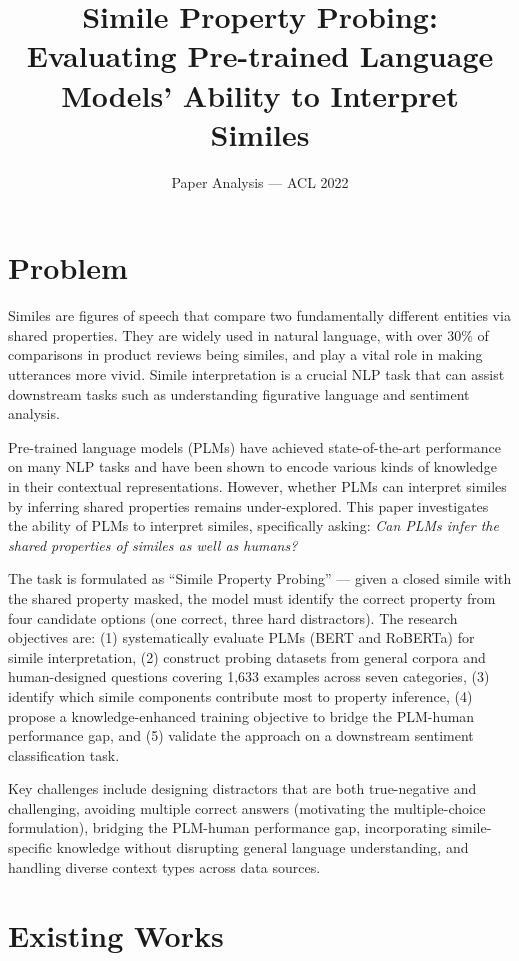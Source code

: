 \documentclass[12pt]{article}
\title{Simile Property Probing: Evaluating Pre-trained Language Models' Ability to Interpret Similes}
\author{Paper Analysis --- ACL 2022}
\date{}
\begin{document}
\maketitle

\section{Problem}

Similes are figures of speech that compare two fundamentally different entities via shared properties. They are widely used in natural language, with over 30\% of comparisons in product reviews being similes, and play a vital role in making utterances more vivid. Simile interpretation is a crucial NLP task that can assist downstream tasks such as understanding figurative language and sentiment analysis.

Pre-trained language models (PLMs) have achieved state-of-the-art performance on many NLP tasks and have been shown to encode various kinds of knowledge in their contextual representations. However, whether PLMs can interpret similes by inferring shared properties remains under-explored. This paper investigates the ability of PLMs to interpret similes, specifically asking: \textit{Can PLMs infer the shared properties of similes as well as humans?}

The task is formulated as ``Simile Property Probing'' --- given a closed simile with the shared property masked, the model must identify the correct property from four candidate options (one correct, three hard distractors). The research objectives are: (1) systematically evaluate PLMs (BERT and RoBERTa) for simile interpretation, (2) construct probing datasets from general corpora and human-designed questions covering 1,633 examples across seven categories, (3) identify which simile components contribute most to property inference, (4) propose a knowledge-enhanced training objective to bridge the PLM-human performance gap, and (5) validate the approach on a downstream sentiment classification task.

Key challenges include designing distractors that are both true-negative and challenging, avoiding multiple correct answers (motivating the multiple-choice formulation), bridging the PLM-human performance gap, incorporating simile-specific knowledge without disrupting general language understanding, and handling diverse context types across data sources.

\section{Existing Works}
\end{document}
